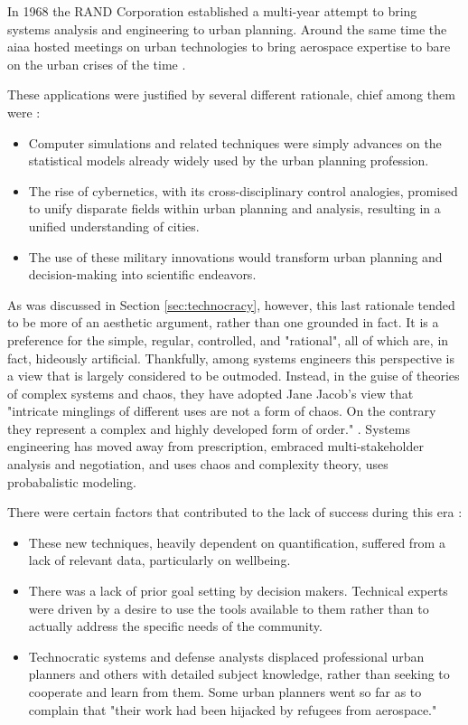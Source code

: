 In 1968 the RAND Corporation established a multi-year attempt to bring systems analysis and engineering to urban planning. Around the same time the \ac{aiaa} hosted meetings on urban technologies to bring aerospace expertise to bare on the urban crises of the time \cite{lightWarfareWelfareDefense2005}.

These applications were justified by several different rationale, chief among them were \cite{lightWarfareWelfareDefense2005}: 

\begin{itemize} \setlength{\itemsep}{0pt} \setlength{\parskip}{0pt} 
	\item{Computer simulations and related techniques were simply advances on the statistical models already widely used by the urban planning profession.}
	\item{The rise of cybernetics, with its cross-disciplinary control analogies, promised to unify disparate fields within urban planning and analysis, resulting in a unified understanding of cities.}
	\item{The use of these military innovations would transform urban planning and decision-making into scientific endeavors.}
\end{itemize}

As was discussed in Section \ref{sec:technocracy}, however, this last rationale tended to be more of an aesthetic argument, rather than one grounded in fact. It is a preference for the simple, regular, controlled, and "rational", all of which are, in fact, hideously artificial. Thankfully, among systems engineers this perspective is a view that is largely considered to be outmoded. Instead, in the guise of theories of complex systems and chaos, they have adopted Jane Jacob's view that "intricate minglings of different uses are not a form of chaos. On the contrary they represent a complex and highly developed form of order." \cite{jacobsDeathLifeGreat2016}. Systems engineering has moved away from prescription, embraced multi-stakeholder analysis and negotiation, and uses chaos and complexity theory, uses probabalistic modeling.

There were certain factors that contributed to the lack of success during this era \cite{lightWarfareWelfareDefense2005}:

\begin{itemize} \setlength{\itemsep}{0pt} \setlength{\parskip}{0pt} 
	\item{These new techniques, heavily dependent on quantification, suffered from a lack of relevant data, particularly on wellbeing.}
	\item{There was a lack of prior goal setting by decision makers. Technical experts were driven by a desire to use the tools available to them rather than to actually address the specific needs of the community.}
	\item{Technocratic systems and defense analysts displaced professional urban planners and others with detailed subject knowledge, rather than seeking to cooperate and learn from them. Some urban planners went so far as to complain that "their work had been hijacked by refugees from aerospace."}
\end{itemize}

